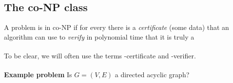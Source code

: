 \documentclass[11  pt]{article}
\begin{document}
%	
%	
%	
%	
	\subsection{The co-NP class}
A problem is in co-NP if for every  there is a \emph{certificate} (some data) that an algorithm can use to \emph{verify} in polynomial time that it is truly a  \\ \\

To be clear, we will often use the terms -certificate and -verifier. \\ \\


\textbf{Example problem} Is $G = (V,E)$ a directed acyclic graph? \\ \\
\end{document}
